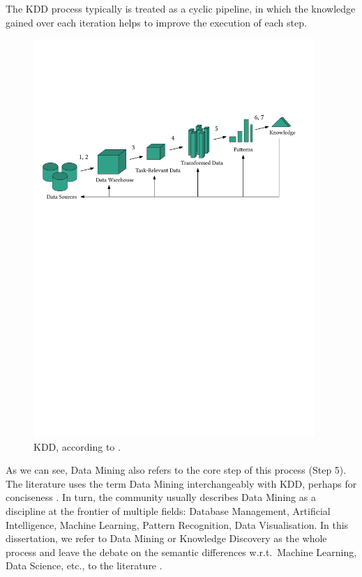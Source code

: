 The \gls{KDD} process typically is treated as a cyclic pipeline, in which the knowledge gained over each iteration helps to improve the execution of each step.

\begin{figure}[ht]
	\centering
	\includegraphics[width=0.95\textwidth]{part1-figures/kdd-compressed.pdf}
	\caption{\acrfull{KDD}, according to \cite{DBLP:books/mk/HanKP2011}.}
	\label{fig:KDD}
\end{figure} 

As we can see, Data Mining also refers to the core step of this process (Step 5). The literature uses the term Data Mining interchangeably with \gls{KDD}, perhaps for conciseness \cite{DBLP:books/mk/HanKP2011}. In turn, the community usually describes Data Mining as a discipline at the frontier of multiple fields: Database Management, Artificial Intelligence, Machine Learning, Pattern Recognition, Data Visualisation. In this dissertation, we refer to Data Mining or Knowledge Discovery as the whole process and leave the debate on the semantic differences w.r.t.\ Machine Learning, Data Science, etc., to the literature \cite{DBLP:books/aw/TanSK2005, Friedman97datamining}.

